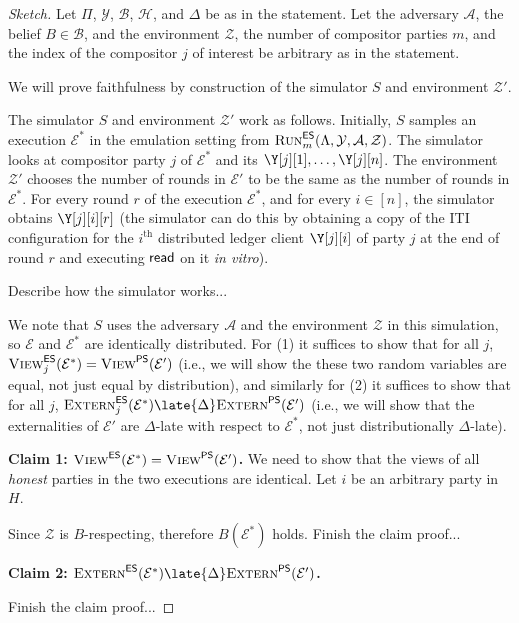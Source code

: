 \begin{proof}[Sketch]
  Let $\Pi$, $\mathcal{Y}$, $\mathcal{B}$, $\mathcal{H}$,
  and $\Delta$ be as in the statement.
  Let the adversary $\mathcal{A}$, the belief $B \in \mathcal{B}$,
  and the environment $\mathcal{Z}$, the number of compositor parties $m$,
  and the index of the compositor $j$ of interest be arbitrary
  as in the statement.

  We will prove faithfulness by
  construction of the simulator $S$ and environment $\mathcal{Z}'$.

  The simulator $S$ and environment $\mathcal{Z}'$ work as follows.
  Initially, $S$ samples an execution
  $\mathcal{E}^*$ in the emulation setting from
  $\textsc{Run}^{\textsf{ES}}_m(\Lambda, \mathcal{Y}, \mathcal{A}, \mathcal{Z})$.
  The simulator looks at compositor party $j$ of $\mathcal{E}^*$
  and its $\Y[j][1], \ldots, \Y[j][n]$.
  The environment $\mathcal{Z}'$ chooses the number of rounds in
  $\mathcal{E}'$ to be the same as the number of rounds in $\mathcal{E}^*$.
  For every round $r$ of the execution $\mathcal{E}^*$,
  and for every $i \in [n]$, the simulator obtains $\Y[j][i][r]$
  (the simulator can do this by obtaining a copy of the ITI
  configuration for the $i^\text{th}$ distributed ledger client $\Y[j][i]$
  of party $j$ at the end of round $r$ and executing $\textsf{read}$ on
  it \emph{in vitro}).

  {\color{red} Describe how the simulator works...}

  We note that $S$ uses the adversary $\mathcal{A}$ and the
  environment $\mathcal{Z}$ in this simulation, so $\mathcal{E}$
  and $\mathcal{E}^*$ are identically distributed.
  For (1) it suffices to show that for all $j$,
  $\textsc{View}^{\textsf{ES}}_j(\mathcal{E}^*) = \textsc{View}^{\textsf{PS}}(\mathcal{E}')$
  (i.e., we will show the these two random variables are equal,
  not just equal by distribution),
  and similarly for (2) it suffices to show that for all $j$,
  $\LCExtern_j(\mathcal{E}^*) \late{\Delta} \PEExtern(\mathcal{E}')$
  (i.e., we will show that the externalities of $\mathcal{E}'$ are $\Delta$-late
  with respect to $\mathcal{E}^*$, not just distributionally $\Delta$-late).

  \noindent
  \textbf{Claim 1: $\textsc{View}^{\textsf{ES}}(\mathcal{E}^*) = \textsc{View}^{\textsf{PS}}(\mathcal{E}')$.} We need to show
  that the views of all \emph{honest} parties in the two executions are identical. Let
  $i$ be an arbitrary party in $H$.

  Since $\mathcal{Z}$ is $B$-respecting, therefore $B(\mathcal{E}^*)$ holds.
  {\color{red} Finish the claim proof...}

  \noindent
  \textbf{Claim 2: $\LCExtern(\mathcal{E}^*) \late{\Delta} \PEExtern(\mathcal{E}')$.}

  {\color{red} Finish the claim proof...}
\end{proof}

